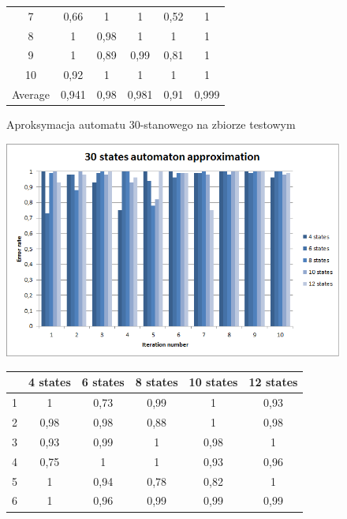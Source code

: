 \documentclass[runningheads,a4paper]{llncs}
\begin{document}
\begin{figure}[!htb]
\begin{tabular}{@{}cccccc@{}}
7       & 0,66     & 1        & 1        & 0,52      & 1    \\
8       & 1        & 0,98     & 1        & 1         & 1     \\
9       & 1        & 0,89     & 0,99     & 0,81      & 1 \\
10      & 0,92     & 1        & 1        & 1         & 1  \\ \bottomrule
Average & 0,941    & 0,98     & 0,981    & 0,91      & 0,999  \\ \bottomrule
\end{tabular}
\vspace{4mm}
\endminipage\hfill
\caption{Aproksymacja automatu 30-stanowego na zbiorze testowym}
\end{figure}

\begin{figure}[!htb]
\includegraphics[scale=0.92]{8.png}
\endminipage\hfill
\hspace{2.2cm}
\renewcommand{\arraystretch}{1.3}%
\begin{tabular}{@{}cccccc@{}}
\toprule
        & 4 states & 6 states & 8 states & 10 states & 12 states    \\ \midrule
1       & 1        & 0,73     & 0,99     & 1         & 0,93 \\
2       & 0,98     & 0,98     & 0,88     & 1         & 0,98 \\
3       & 0,93     & 0,99     & 1        & 0,98      & 1 \\
4       & 0,75     & 1        & 1        & 0,93      & 0,96   \\
5       & 1        & 0,94     & 0,78     & 0,82      & 1   \\
6       & 1        & 0,96     & 0,99     & 0,99      & 0,99    \\

\end{tabular}
\end{figure}
\end{document}
